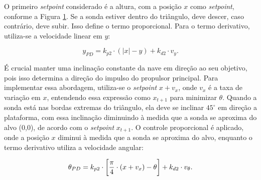 \documentclass[12pt,           %
a4paper,                       %
openany,                       %
oneside,                       %
chapter=TITLE,                 %
english,                       %
spanish,                       %
brazil,                        %
sumario=tradicional]{abntex2}  %
\begin{document}
\begin{OnehalfSpace}
\begin{figure}[H]
    \label{fig:aa}
\end{figure}
\vspace*{-1cm}
{\raggedright {}}

O primeiro \textit{setpoint} considerado é a altura, com a posição $x$ como \textit{setpoint}, conforme a Figura \ref{fig:aa}. Se a sonda estiver dentro do triângulo, deve descer, caso contrário, deve subir. Isso define o termo proporcional. Para o termo derivativo, utiliza-se a velocidade linear em $y$:

\begin{equation}
    y_{PD} = k_{p2}\cdot (|x|-y)+k_{d2}\cdot v_y.
    \label{eq:ypd}
\end{equation}


É crucial manter uma inclinação constante da nave em direção ao seu objetivo, pois isso determina a direção do impulso do propulsor principal. Para implementar essa abordagem, utiliza-se o \textit{setpoint} $x + v_x$, onde $v_x$ é a taxa de variação em $x$, entendendo essa expressão como $x_{t+1}$ para minimizar $\theta$. Quando a sonda está nas bordas extremas do triângulo, ela deve se inclinar $ 45^\circ$ em direção a plataforma, com essa inclinação diminuindo à medida que a sonda se aproxima do alvo (0,0), de acordo com o \textit{setpoint} $x_{t+1}$. O controle proporcional é aplicado, onde a posição $x$ diminui à medida que a sonda se aproxima do alvo, enquanto o termo derivativo utiliza a velocidade angular:

\begin{equation}
    \theta_{PD} = k_{p2}\cdot \bigg{[} \frac{\pi}{4}\cdot (x+v_x)-\theta\bigg{]}+k_{d2}\cdot v_{\theta}.
    \label{eq:tpd}
\end{equation}


\end{OnehalfSpace}
\end{document}
